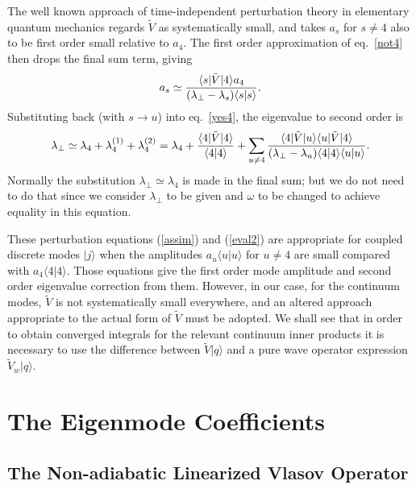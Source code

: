 \documentclass{jpp}
\def\ket#1{|#1\rangle}
\def\bra#1{\langle#1}
\begin{document}
The well known approach of time-independent perturbation theory in
elementary quantum mechanics
\citep[see e.g.][Section 43]{Dirac1958}
regards $\tilde{V}$ as systematically small, and takes $a_s$ for
$s\not=4$ also to be first order small relative to $a_4$. The first
order approximation of eq.\ \ref{not4} then drops the final sum term,
giving
\begin{equation}
  \label{assim}
  a_s \simeq {\bra{s}|\tilde{V}\ket{4}a_4\over (\lambda_\perp-\lambda_s)\bra{s}\ket{s}}.
\end{equation}
Substituting back (with $s\to u$) into eq.\ \ref{yes4}, the
eigenvalue to second order is
\begin{equation}
  \label{eval2}
 \lambda_\perp\simeq \lambda_4+\lambda_{4}^{(1)}+\lambda_{4}^{(2)}=\lambda_4
  +{\bra{4}|\tilde{V}\ket{4}\over \bra{4}\ket{4}}
    +\sum_{u\not=4}
    {\bra{4}|\tilde{V}\ket{u}\bra{u}|\tilde{V}\ket{4}\over
      (\lambda_\perp-\lambda_u)\bra{4}\ket{4}\bra{u}\ket{u}}.
\end{equation}
Normally the substitution $\lambda_\perp\simeq\lambda_4$ is made in
the final sum; but we do not need to do that since we consider
$\lambda_\perp$ to be given and $\omega$ to be changed to achieve
equality in this equation.

These perturbation equations (\ref{assim}) and (\ref{eval2}) are
appropriate for coupled discrete modes $\ket{j}$ when the amplitudes
$a_u\bra{u}\ket{u}$ for $u\not=4$ are small compared with
$a_4\bra{4}\ket{4}$. Those equations give the first order mode
amplitude and second order eigenvalue correction from them.  However,
in our case, for the continuum modes, $\tilde{V}$ is not
systematically small everywhere, and an altered approach appropriate
to the actual form of $\tilde{V}$ must be adopted. We shall see that
in order to obtain converged integrals for the relevant continuum
inner products it is necessary to use the difference between
$\tilde V \ket{q}$ and a pure wave operator expression
$\tilde V_w\ket{q}$.


\section{The Eigenmode Coefficients}
\subsection{The Non-adiabatic Linearized Vlasov Operator}
\end{document}
